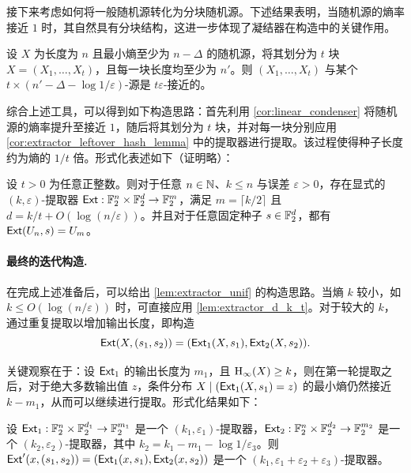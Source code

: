 接下来考虑如何将一般随机源转化为分块随机源。下述结果表明，当随机源的熵率接近 $1$ 时，其自然具有分块结构，这进一步体现了凝结器在构造中的关键作用。

\begin{lemma}\label{lem:convert_to_block_source}
    设 $X$ 为长度为 $n$ 且最小熵至少为 $n - \Delta$ 的随机源，将其划分为 $t$ 块 $X = (X_1, \ldots, X_t)$，且每一块长度均至少为 $n'$。则 $(X_1, \ldots, X_t)$ 与某个 $t \times (n' - \Delta - \log 1 / \varepsilon)$-源是 $t\varepsilon$-接近的。
\end{lemma}

综合上述工具，可以得到如下构造思路：首先利用 \cref{cor:linear_condenser} 将随机源的熵率提升至接近 $1$，随后将其划分为 $t$ 块，并对每一块分别应用 \cref{cor:extractor_leftover_hash_lemma} 中的提取器进行提取。该过程使得种子长度约为熵的 $1/t$ 倍。形式化表述如下（证明略）：

\begin{lemma}\label{lem:extractor_d_k_t}
    设 $t > 0$ 为任意正整数。则对于任意 $n \in \mathbb{N}$、$k \le n$ 与误差 $\varepsilon > 0$，存在显式的 $(k, \varepsilon)$-提取器 $\mathsf{Ext} : \mathbb{F}_2^n \times \mathbb{F}_2^d \to \mathbb{F}_2^m$，满足 $m = \lceil k / 2 \rceil$ 且 $d = k / t + O(\log (n / \varepsilon))$。并且对于任意固定种子 $s \in \mathbb{F}_2^d$，都有 $\mathsf{Ext}(U_n, s) = U_m$。
\end{lemma}

\paragraph{最终的迭代构造.}

在完成上述准备后，可以给出 \cref{lem:extractor_unif} 的构造思路。当熵 $k$ 较小，如 $k \le O(\log (n / \varepsilon))$ 时，可直接应用 \cref{lem:extractor_d_k_t}。对于较大的 $k$，通过重复提取以增加输出长度，即构造
$$
\mathsf{Ext}(X, (s_1, s_2)) = (\mathsf{Ext}_1(X, s_1), \mathsf{Ext}_2(X, s_2)).
$$

关键观察在于：设 $\mathsf{Ext}_1$ 的输出长度为 $m_1$，且 $\mathrm{H}_\infty(X) \ge k$，则在第一轮提取之后，对于绝大多数输出值 $z$，条件分布 $X \mid (\mathsf{Ext}_1(X, s_1) = z)$ 的最小熵仍然接近 $k - m_1$，从而可以继续进行提取。形式化结果如下：

\begin{lemma}\label{lem:two_ext}
    设 $\mathsf{Ext}_1 : \mathbb{F}_2^n \times \mathbb{F}_2^{d_1} \to \mathbb{F}_2^{m_1}$ 是一个 $(k_1, \varepsilon_1)$-提取器，$\mathsf{Ext}_2 : \mathbb{F}_2^n \times \mathbb{F}_2^{d_2} \to \mathbb{F}_2^{m_2}$ 是一个 $(k_2, \varepsilon_2)$-提取器，其中 $k_2 = k_1 - m_1 - \log 1 / \varepsilon_3$。则 $\mathsf{Ext}'(x, (s_1, s_2)) = (\mathsf{Ext}_1(x, s_1), \mathsf{Ext}_2(x, s_2))$ 是一个 $(k_1, \varepsilon_1 + \varepsilon_2 + \varepsilon_3)$-提取器。
\end{lemma}

